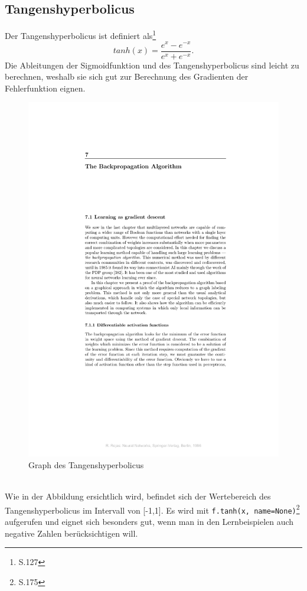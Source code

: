 \subsection{Tangenshyperbolicus}
Der Tangenshyperbolicus ist definiert als\footnote{\cite{Bishop1995}S.127}
\begin{equation}
tanh(x)=\frac{e^x - e^{-x}}{e^x + e^{-x}}.
\end{equation}
Die Ableitungen der Sigmoidfunktion und des Tangenshyperbolicus sind leicht zu berechnen, weshalb sie sich gut zur Berechnung des Gradienten der Fehlerfunktion eignen.
\begin{figure}[!htp]
	\includegraphics[page=3,trim = 10.3cm 22cm 5cm 4.7cm,clip=true,scale=1.4]{images/BackPropRojas.pdf}
	\centering
	\caption{Graph des Tangenshyperbolicus \cite{Rojas1996}}
\end{figure}\\
Wie in der Abbildung ersichtlich wird, befindet sich der Wertebereich des Tangenshyperbolicus im Intervall von [-1,1]. Es wird mit \lstinline$f.tanh(x, name=None)$\footnote{\cite{building}S.175} aufgerufen und eignet sich besonders gut, wenn man in den Lernbeispielen auch negative Zahlen ber\"ucksichtigen will.
